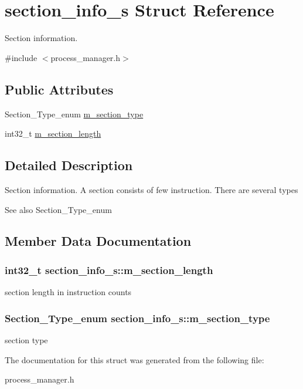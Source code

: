 \hypertarget{structsection__info__s}{
\section{section\_\-info\_\-s Struct Reference}
\label{structsection__info__s}
}


Section information.  




{\ttfamily \#include $<$process\_\-manager.h$>$}

\subsection*{Public Attributes}
\begin{DoxyCompactItemize}
\item 
Section\_\-Type\_\-enum \hyperlink{structsection__info__s_a8a3c90037442b973b1fbfd11893af7f8}{m\_\-section\_\-type}
\item 
int32\_\-t \hyperlink{structsection__info__s_a9338972d43c2662c79d169671a6c72b2}{m\_\-section\_\-length}
\end{DoxyCompactItemize}


\subsection{Detailed Description}
Section information. A section consists of few instruction. There are several types \begin{DoxySeeAlso}{See also}
Section\_\-Type\_\-enum 
\end{DoxySeeAlso}


\subsection{Member Data Documentation}
\hypertarget{structsection__info__s_a9338972d43c2662c79d169671a6c72b2}{
\subsubsection[{m\_\-section\_\-length}]{\setlength{\rightskip}{0pt plus 5cm}int32\_\-t {\bf section\_\-info\_\-s::m\_\-section\_\-length}}}
\label{structsection__info__s_a9338972d43c2662c79d169671a6c72b2}
section length in instruction counts \hypertarget{structsection__info__s_a8a3c90037442b973b1fbfd11893af7f8}{
\subsubsection[{m\_\-section\_\-type}]{\setlength{\rightskip}{0pt plus 5cm}Section\_\-Type\_\-enum {\bf section\_\-info\_\-s::m\_\-section\_\-type}}}
\label{structsection__info__s_a8a3c90037442b973b1fbfd11893af7f8}
section type 

The documentation for this struct was generated from the following file:\begin{DoxyCompactItemize}
\item 
process\_\-manager.h\end{DoxyCompactItemize}

